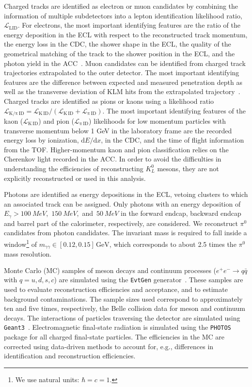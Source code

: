 \documentclass[twocolumn,aps,prd,superscriptaddress,nofootinbib,floatfix,preprintnumbers,a4]{revtex4-1}
\newcommand{\Eg}{\ensuremath{E_{\gamma}}\xspace}
\begin{document}
Charged tracks are identified as electron or muon candidates by combining the information of multiple subdetectors into a lepton identification likelihood ratio, $\mathcal{L}_\mathrm{LID}$. For electrons, the most important identifying features are the ratio of the energy deposition in the ECL with respect to the reconstructed track momentum, the energy loss in the CDC, the shower shape in the ECL, the quality of the geometrical matching of the track to the shower position in the ECL, and the photon yield in the ACC~\citep{HANAGAKI2002490}. Muon candidates can be identified from charged track trajectories extrapolated to the outer detector. The most important identifying features are the difference between expected and measured penetration depth as well as the transverse deviation of KLM hits from the extrapolated trajectory~\citep{ABASHIAN200269}. Charged tracks are identified as pions or kaons using a likelihood ratio $\mathcal{L}_\mathrm{K/\pi \, \mathrm{ID}} = \mathcal{L}_\mathrm{K\, \mathrm{ID}} / \left( \mathcal{L}_\mathrm{K \, \mathrm{ID}} + \mathcal{L}_\mathrm{\pi \, \mathrm{ID}} \right)$. The most important identifying features of the kaon ($\mathcal{L}_\mathrm{K \, \mathrm{ID}} $) and pion ($\mathcal{L}_\mathrm{\pi \, \mathrm{ID}} $) likelihoods for low momentum particles with transverse momentum below 1 GeV in the laboratory frame are the recorded energy loss by ionization, $\mathrm{d}E/\mathrm{d}x$, in the CDC, and the time of flight information from the TOF. Higher-momentum kaon and pion classification relies on the Cherenkov light recorded in the ACC. In order to avoid the difficulties in understanding the efficiencies of reconstructing $K^0_L$ mesons, they are not explicitly reconstructed or used in this analysis.

Photons are identified as energy depositions in the ECL, vetoing clusters to which an associated track can be assigned. Only photons with an energy deposition of \mbox{\Eg $ > \SI{100}{MeV}$, $\SI{150}{MeV}$, and $\SI{50}{MeV}$} in the forward endcap, backward endcap and barrel part of the calorimeter, respectively, are considered. We reconstruct $\pi^0$ candidates from photon candidates. The invariant mass is required to fall inside a window\footnote{We use natural units: $\hbar = c = 1$.}  of $m_{\gamma\gamma} \in [0.12, 0.15] \, \text{GeV}$, which corresponds to about 2.5 times the $\pi^0$ mass resolution. 

Monte Carlo (MC) samples of \PB meson decays and continuum processes ($e^+ e^- \to q \bar q$ with $q = u,d,s,c$) are simulated using the \texttt{EvtGen} generator~\citep{EvtGen}. These samples are used to evaluate reconstruction efficiencies and acceptance, and to estimate background contaminations. The sample sizes used correspond to approximately ten and five times, respectively, the Belle collision data for \PB meson and continuum decays. The interactions of particles traversing the detector are simulated using \texttt{Geant3}~\citep{Geant3}. Electromagnetic final-state radiation is simulated using the \texttt{PHOTOS}~\citep{Photos} package for all charged final-state particles. The efficiencies in the MC are corrected using data-driven methods to account for, e.g., differences in identification and reconstruction efficiencies. 
\end{document}
